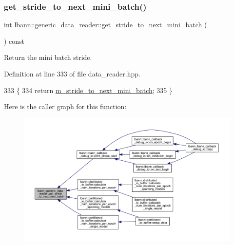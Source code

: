 \subsubsection{\texorpdfstring{get\+\_\+stride\+\_\+to\+\_\+next\+\_\+mini\+\_\+batch()}{get\_stride\_to\_next\_mini\_batch()}}
{\footnotesize\ttfamily int lbann\+::generic\+\_\+data\+\_\+reader\+::get\+\_\+stride\+\_\+to\+\_\+next\+\_\+mini\+\_\+batch (\begin{DoxyParamCaption}{ }\end{DoxyParamCaption}) const\hspace{0.3cm}{\ttfamily [inline]}}



Return the mini batch stride. 



Definition at line 333 of file data\+\_\+reader.\+hpp.


\begin{DoxyCode}
333                                             \{
334     \textcolor{keywordflow}{return} \hyperlink{classlbann_1_1generic__data__reader_a02c4632cc7cad5c3e4062934c41717a0}{m\_stride\_to\_next\_mini\_batch};
335   \}
\end{DoxyCode}
Here is the caller graph for this function\+:\nopagebreak
\begin{figure}[H]
\begin{center}
\leavevmode
\includegraphics[width=350pt]{classlbann_1_1generic__data__reader_a2d1d5657e8b9bf8b8a9d51b33aedf017_icgraph}
\end{center}
\end{figure}
\mbox{\label{classlbann_1_1generic__data__reader_abeb849fb8e10b4fa317c90bc33f61758}} 
